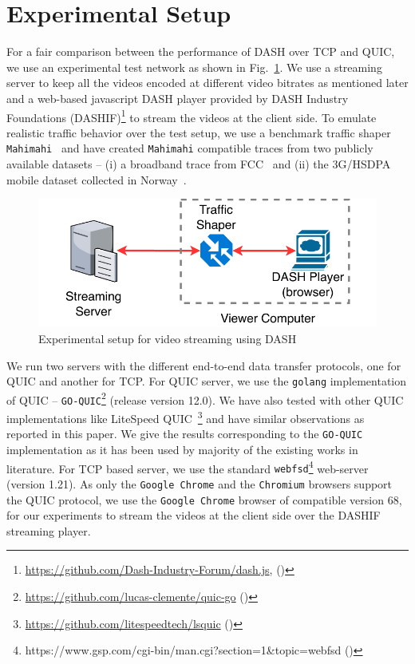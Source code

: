 \section{Experimental Setup}
\label{sec:experimentalSetup}
For a fair comparison between the performance of DASH over TCP and QUIC,
we use an experimental test network as shown in Fig.~\ref{fig:expeirmental_setup}. We use a streaming server to keep all the videos encoded at different video bitrates as mentioned later and a web-based javascript DASH player provided by DASH Industry Foundations (DASHIF)\footnote{\url{https://github.com/Dash-Industry-Forum/dash.js}, (\lastaccessedtoday)} to stream the videos at the client side. To emulate realistic traffic behavior over the test setup, we use a benchmark traffic shaper {\tt Mahimahi}~\cite{mahimahi} and have created {\tt Mahimahi} compatible traces from two publicly available datasets -- (i) a broadband trace from FCC~\cite{dataset-fcc} and (ii) the 3G/HSDPA mobile dataset collected in Norway~\cite{dataset-norway}.

\begin{figure}[h]
	\centering
	\includegraphics[width=0.8\linewidth]{img/experimental_setup}
	\caption{\label{fig:expeirmental_setup}Experimental setup for video streaming using DASH}
\end{figure}

We run two servers with the different end-to-end data transfer protocols, one for QUIC and another for TCP. For QUIC server, we use the {\tt golang} implementation of QUIC -- \texttt{GO-QUIC}\footnote{\url{https://github.com/lucas-clemente/quic-go} (\lastaccessedtoday)} (release version 12.0). We have also tested with other QUIC implementations like LiteSpeed QUIC~\footnote{\url{https://github.com/litespeedtech/lsquic} (\lastaccessedtoday)} and have similar observations as reported in this paper. We give the results corresponding to the \texttt{GO-QUIC} implementation as it has been used by majority of the existing works in literature. For TCP based server, we use the standard {\tt webfsd}\footnote{https://www.gsp.com/cgi-bin/man.cgi?section=1\&topic=webfsd (\lastaccessedtoday)} web-server (version 1.21). As only the {\tt Google Chrome} and the {\tt Chromium} browsers support the QUIC protocol, we use the {\tt Google Chrome} browser of compatible version 68, for our experiments to stream the videos at the client side over the DASHIF streaming player.



